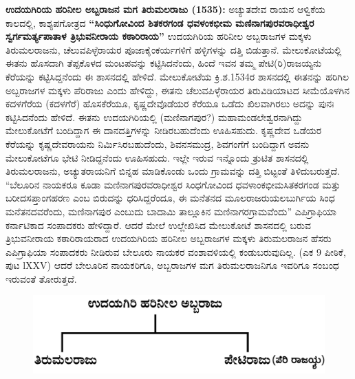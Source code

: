 \textbf{ಉದಯಗಿರಿಯ ಹರಿನೀಲ ಅಬ್ಬರಾಜನ ಮಗ ತಿರುಮಲರಾಜು (1535):} ಅಚ್ಯುತದೇವ ರಾಯನ ಆಳ್ವಿಕೆಯ ಕಾಲದಲ್ಲಿ, ಕಾಶ್ಯಪಗೋತ್ರದ \textbf{“ಸಿಂಧುಗೋವಿಂದ ಶಿತಕರಗಂಡ ಧವಳಂಕಭೀಮ ಮಣಿನಾಗಪುರವರಾಧೀಶ್ವರ ಸ್ವರ್ಗಮರ್ತ್ಯ\-ಪಾತಾಳ ತ್ರಿಭುವನೀರಾಯ ಕಠಾರಿರಾಯ”} ಉದಯಗಿರಿಯ ಹರಿನೀಲ ಅಬ್ಬರಾಜಗಳ ಮಕ್ಕಳು ತಿರುಮಲರಾಜನು, ಚೆಲುವ\-ಪಿಳ್ಳೆರಾಯರ ಪೂಜಾಕೈಂಕರ್ಯಗಳಿಗೆ ಹಳ್ಳಿಗಳನ್ನು ದತ್ತಿ ಬಿಡುತ್ತಾನೆ. ಮೇಲುಕೋಟೆಯಲ್ಲಿ ಈತನು ಹೊಸದಾಗಿ ತೆಪ್ಪಕೊಳದ ಮಂಟಪವನ್ನು ಕಟ್ಟಿಸಿದನೆಂದು, ಹಿಂದೆ ಇವನ ತಮ್ಮ ಪೇಟಿ(ರಿ)ರಾಜಯ್ಯನು ಕೆರೆಯನ್ನು ಕಟ್ಟಿಸಿದ್ದನೆಂದು ಈ ಶಾಸನದಲ್ಲಿ ಹೇಳಿದೆ. ಮೇಲುಕೋಟೆಯ ಕ್ರಿ.ಶ.1534ರ ಶಾಸನದಲ್ಲಿ ಈತನನ್ನು ಹರಿಗಿಲ ಅಬ್ಬರಾಜಗಳ ಮಕ್ಕಳು ಪೆರಿರಾಜು ಎಂದು ಹೇಳಿದ್ದು, ಈತನು ಚೆಲುವಪಿಳ್ಳೆರಾಯರ ತಿರುವಿಡಿಯಾಟದ ಸೀಮೆಯೊಳಗಿನ ಕದಳಗೆರೆಯ (ಕದಳಗೆರೆ) ಹೊಸಕೆರೆಯೂ, ಕೃಷ್ಣದೇವೊಡೆಯರ ಕೆರೆಯೂ ಒಡೆದು ಖಿಲವಾಗಿರಲು ಅದನ್ನು ಪುನಃ ಕಟ್ಟಿಸಿದನೆಂದು ಹೇಳಿದೆ. ಈತನು ಉದಯಗಿರಿಯಲ್ಲಿ (ಮಣಿನಾಗಪುರ?) ಮಹಾಮಂಡಲೇಶ್ವರನಾಗಿದ್ದು ಮೇಲುಕೋಟೆಗೆ ಬಂದಿದ್ದಾಗ ಈ ದಾನದತ್ತಿಗಳನ್ನು ನೀಡಿರಬಹುದೆಂದು ಊಹಿಸಹುದು. ಕೃಷ್ಣದೇವ ಒಡೆಯರ ಕೆರೆಯನ್ನು ಕೃಷ್ಣದೇವರಾಯನು ನಿರ್ಮಿಸಿರಬಹುದೆಂದು, ಶಿವನಸಮುದ್ರ, ಶಿವಗಂಗೆಗೆ ಬಂದಿದ್ದಾಗ ಅವನು ಮೇಲುಕೋಟೆಗೂ ಭೇಟಿ ನೀಡಿದ್ದನೆಂದು ಊಹಿಸಹುದು. ಇಲ್ಲೇ ಇರುವ ಇನ್ನೊಂದು ತ್ರುಟಿತ ಶಾಸನದಲ್ಲಿ ತಿರುಮಲರಾಜನು, ಅಚ್ಯುತರಾಯನಿಗೆ ಬಿನ್ನಹ ಮಾಡಿಕೊಂಡು ಒಂದು ಗ್ರಾಮವನ್ನು ದತ್ತಿ ಬಿಟ್ಟಂತೆ ತಿಳಿದುಬರುತ್ತದೆ. “ಬೆಲೂರಿನ ನಾಯಕರೂ ಕೂಡಾ ಮಣಿನಾಗಪುರವರಾಧೀಶ್ವರ ಸಿಂಧಗೋವಿಂದ ಧವಳಾಂಕಭೀಮ\break ಸಿತಕರಗಂಡ ಮತ್ತು ಬರೀದಸಪ್ತಾಂಗಹರಣ ಎಂಬ ಬಿರುದನ್ನು ಧರಿಸಿದ್ದರೆಂದೂ, ಈ ಮನೆತನದ ಮೂಲರಾಜರು\break ಯಲಬುರ್ಗಿಯ ಸಿಂಧ ಮನೆತನದವರೆಂದು, ಮಣಿನಾಗಪುರ ಎಂಬುದು ಬಾದಾಮಿ ತಾಲ್ಲೂಕಿನ ಮಣಿನಾಗರಗ್ರಾಮವೆಂದು” ಎಪಿಗ್ರಾಫಿಯಾ ಕರ್ನಾಟಿಕಾದ ಸಂಪಾದಕರು ಹೇಳಿದ್ದಾರೆ. ಆದರೆ ಮೇಲೆ ಉಲ್ಲೇಖಿಸಿದ ಮೇಲುಕೋಟೆ ಶಾಸನದಲ್ಲಿ ಬರುವ ತ್ರಿಭುವನೀರಾಯ ಕಠಾರಿರಾಯರಾದ ಉದಯಗಿರಿಯ ಹರಿನೀಲ ಅಬ್ಬರಾಜಗಳ ಮಕ್ಕಳು ತಿರುಮಲರಾಜನ ಹೆಸರು ಎಪಿಗ್ರಾಫಿಯಾ ಸಂಪಾದಕರು ನೀಡಿರುವ ಬೇಲೂರು ನಾಯಕರ ವಂಶಾವಳಿ\-ಯಲ್ಲಿ ಕಂಡುಬರುವುದಿಲ್ಲ. (ಎಕ 9 ಪೀಠಿಕೆ, ಪುಟ lXXV) ಆದರೆ ಬೇಲೂರಿನ ನಾಯಕರಿಗೂ, ಅಬ್ಬರಾಜಗಳ ಮಗ ತಿರುಮಲರಾಜನಿಗೂ ಇವರಿಗೂ ಸಂಬಂಧ ಇರುವಂತೆ ತೋರುತ್ತದೆ.
\begin{figure}[H]
\includegraphics[scale=.15]{images/chap3/chap3fig40.jpeg}
\end{figure}

